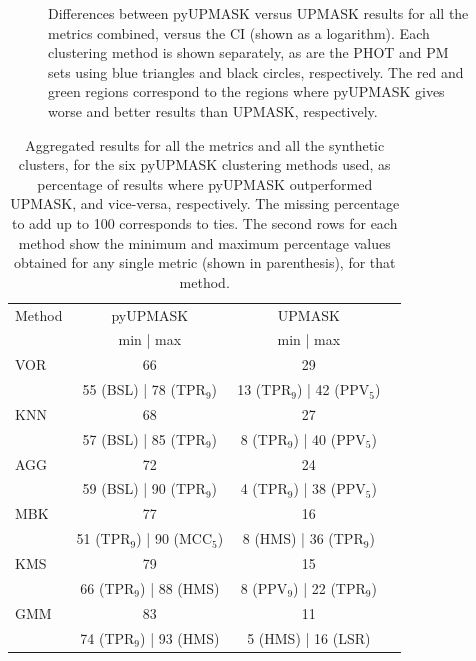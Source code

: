 \documentclass[draft]{aa}
\begin{document}
 \begin{figure}
 \caption{Differences between pyUPMASK versus UPMASK results for all the
 metrics combined, versus the CI (shown as a logarithm). Each clustering method
 is shown separately, as are the PHOT and PM sets using blue triangles and
 black circles, respectively. The red and green regions correspond to the
 regions where pyUPMASK gives worse and better results than UPMASK,
 respectively.}
 \label{fig:CIdelta}
 \end{figure}

 \begin{table}
 \caption{Aggregated results for all the metrics and all the synthetic
 clusters, for the six pyUPMASK clustering methods used, as percentage of
 results where pyUPMASK outperformed UPMASK, and vice-versa, respectively. The
 missing percentage to add up to 100 corresponds to ties.
 The second rows for each method show the minimum and maximum percentage values
 obtained for any single metric (shown in parenthesis), for that method.}
 \label{tab:results}
 \centering
 \begin{tabular}{l c c l}
 \hline\hline
 Method & pyUPMASK & UPMASK\\
  & min | max & min | max \\
 \hline
   VOR & 66 & 29 \\
   & 55 (BSL) | 78 (TPR$_9$) & 13 (TPR$_9$) | 42 (PPV$_5$)\\
   KNN & 68 & 27\\
   & 57 (BSL) | 85 (TPR$_9$) & 8 (TPR$_9$) | 40 (PPV$_5$)\\
   AGG & 72 & 24 \\
   & 59 (BSL) | 90 (TPR$_9$) & 4 (TPR$_9$) | 38 (PPV$_5$)\\
   MBK & 77 & 16\\
   & 51 (TPR$_9$) | 90 (MCC$_5$) & 8 (HMS) | 36 (TPR$_9$)\\
   KMS & 79 & 15\\
   & 66 (TPR$_9$) | 88 (HMS) & 8 (PPV$_9$) | 22 (TPR$_9$)\\
   GMM & 83 & 11\\
   & 74 (TPR$_9$) | 93 (HMS) & 5 (HMS) | 16 (LSR)\\
 \hline
 \end{tabular}
 \end{table}
\end{document}
